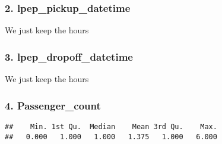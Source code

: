 \documentclass[
  18pt,
  a4paper]{article}
\newenvironment{Shaded}{\begin{snugshade}}{\end{snugshade}}
\newcommand{\CommentTok}[1]{\textcolor[rgb]{0.56,0.35,0.01}{\textit{#1}}}
\newcommand{\DecValTok}[1]{\textcolor[rgb]{0.00,0.00,0.81}{#1}}
\newcommand{\KeywordTok}[1]{\textcolor[rgb]{0.13,0.29,0.53}{\textbf{#1}}}
\newcommand{\NormalTok}[1]{#1}
\newcommand{\OperatorTok}[1]{\textcolor[rgb]{0.81,0.36,0.00}{\textbf{#1}}}
\newcommand{\StringTok}[1]{\textcolor[rgb]{0.31,0.60,0.02}{#1}}
\begin{document}
\hypertarget{lpep_pickup_datetime}{%
\subsubsection{2. lpep\_pickup\_datetime}\label{lpep_pickup_datetime}}

We just keep the hours

\begin{Shaded}
\end{Shaded}

\hypertarget{lpep_dropoff_datetime}{%
\subsubsection{3. lpep\_dropoff\_datetime}\label{lpep_dropoff_datetime}}

We just keep the hours

\begin{Shaded}
\end{Shaded}

\hypertarget{passenger_count}{%
\subsubsection{4. Passenger\_count}\label{passenger_count}}

\begin{Shaded}
\end{Shaded}

\begin{verbatim}
##    Min. 1st Qu.  Median    Mean 3rd Qu.    Max. 
##   0.000   1.000   1.000   1.375   1.000   6.000
\end{verbatim}
\end{document}
